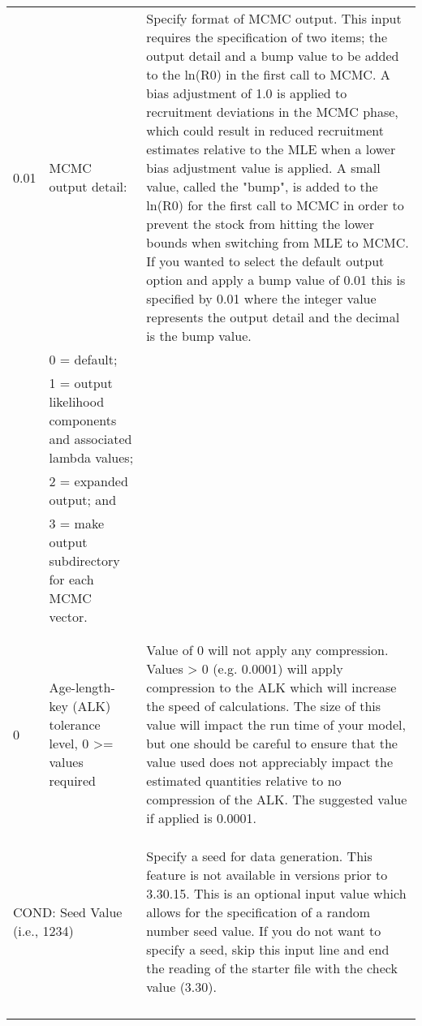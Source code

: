 {\begin{landscape}
\begin{longtable}{p{1.5cm} p{7.2cm} p{12.3cm}}
  \hline
  0.01 & MCMC output detail: & \multirow{1}{1cm}[-0.25cm]{\parbox{12.5cm}{Specify format of MCMC output. This input requires the specification of two items; the output detail and a bump value to be added to the ln(R0) in the first call to MCMC. A bias adjustment of 1.0 is applied to recruitment deviations in the MCMC phase, which could result in reduced recruitment estimates relative to the MLE when a lower bias adjustment value is applied.  A small value, called the "bump", is added to the ln(R0) for the first call to MCMC in order to prevent the stock from hitting the lower bounds when switching from MLE to MCMC. If you wanted to select the default output option and apply a bump value of 0.01 this is specified by 0.01 where the integer value represents the output detail and the decimal is the bump value.}} \Tstrut\\
  & 0 = default; & \\
  & 1 = output likelihood components and associated lambda values; &  \\
  & 2 = expanded output; and &  \\		 
  & 3 = make output subdirectory for each MCMC vector. &  \\
  & & \\
  & & \\  		 
  
  \hline
  \hypertarget{ALK}{0} & Age-length-key (ALK) tolerance level, 0 >= values required & \multirow{1}{1cm}[-0.25cm]{\parbox{12.5cm}{Value of 0 will not apply any compression.  Values > 0 (e.g. 0.0001) will apply compression to the ALK which will increase the speed of calculations.  The size of this value will impact the run time of your model, but one should be careful to ensure that the value used does not appreciably impact the estimated quantities relative to no compression of the ALK.  The suggested value if applied is 0.0001.}} \Tstrut\\ 
  & & \\
  & & \\
  & & \Bstrut\\
  
  \hline  
  \multicolumn{2}{l}{COND: Seed Value (i.e., 1234)}& \multirow{1}{1cm}[-0.25cm]{\parbox{12.5cm}{Specify a seed for data generation. This feature is not available in versions prior to 3.30.15. This is an optional input value which allows for the specification of a random number seed value.  If you do not want to specify a seed, skip this input line and end the reading of the starter file with the check value (3.30). }} \Tstrut\\
  & & \\ 
  & & \\
  & & \\ 
  & & \\
  

\end{longtable}
\end{landscape}}

